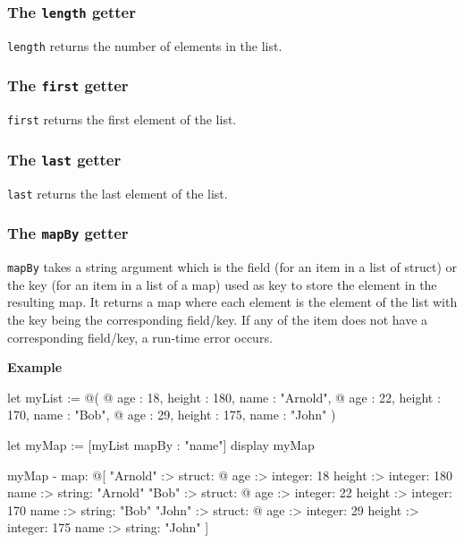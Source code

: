 \documentclass[10pt,openright,twosides]{report}
\newcommand{\gtlinline}[1]{\colorbox{light-blue}{\lstinline[language=gtl]{#1}}}
\newcommand{\example}{\vspace{.75em}\noindent\textbf{Example}\vspace{0em}}
\begin{document}
\subsubsection{The \texttt{length} getter}

\gtlinline{length} returns the number of elements in the list.

\subsubsection{The \texttt{first} getter}

\gtlinline{first} returns the first element of the list.

\subsubsection{The \texttt{last} getter}

\gtlinline{last} returns the last element of the list.

\subsubsection{The \texttt{mapBy} getter}
\label{sec:mapByGetterOnList}

\gtlinline{mapBy} takes a string argument which is the field (for an item in a list of struct) or the key (for an item in a list of a map) used as key to store the element in the resulting map. It returns a map where each element is the element of the list with the key being the corresponding field/key. If any of the item does not have a corresponding field/key, a run-time error occurs.

\example
\begin{gtl}
let myList := @(
  @{ age : 18, height : 180, name : "Arnold"},
  @{ age : 22, height : 170, name : "Bob"},
  @{ age : 29, height : 175, name : "John"}
)

let myMap := [myList mapBy : "name"]
display myMap
\end{gtl}
\begin{console}
myMap - map: @[
    "Arnold" :>
        struct: @{
            age :>
                integer: 18
            height :>
                integer: 180
            name :>
                string: "Arnold"
        }
    "Bob" :>
        struct: @{
            age :>
                integer: 22
            height :>
                integer: 170
            name :>
                string: "Bob"
        }
    "John" :>
        struct: @{
            age :>
                integer: 29
            height :>
                integer: 175
            name :>
                string: "John"
        }
]
\end{console}
\end{document}
